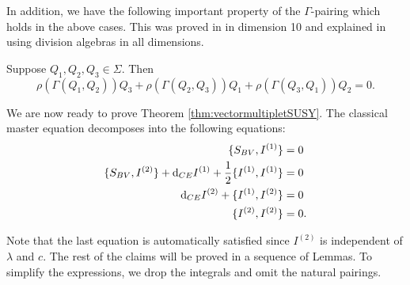 \documentclass[10pt, oneside]{article}
\begin{document}
In addition, we have the following important property of the $\Gamma$-pairing which holds in the above cases. This was proved in \cite{Schray} in dimension 10 and explained in \cite{BaezHuerta} using division algebras in all dimensions.

\begin{prop}
Suppose $Q_1, Q_2, Q_3\in\Sigma$. Then
\[\rho(\Gamma(Q_1, Q_2))Q_3 + \rho(\Gamma(Q_2, Q_3))Q_1 + \rho(\Gamma(Q_3, Q_1))Q_2 = 0.\]
\label{prop:3psi}
\end{prop}

We are now ready to prove Theorem \ref{thm:vectormultipletSUSY}. The classical master equation decomposes into the following equations:
\begin{align*}
\{S_{BV}, I^{(1)}\} &= 0 \\
\{S_{BV}, I^{(2)}\} + {\rm d}_{CE} I^{(1)} + \frac{1}{2}\{I^{(1)}, I^{(1)}\} &= 0 \\
{\rm d}_{CE} I^{(2)} + \{I^{(1)}, I^{(2)}\} &= 0 \\
\{I^{(2)}, I^{(2)}\} &= 0.
\end{align*}

Note that the last equation is automatically satisfied since $I^{(2)}$ is independent of $\lambda$ and $c$. The rest of the claims will be proved in a sequence of Lemmas. To simplify the expressions, we drop the integrals and omit the natural pairings.
\end{document}
